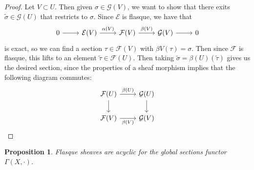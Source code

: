\documentclass[psamsfonts, 12pt]{amsart}
\newtheorem{prop}[thm]{Proposition}
\theoremstyle{definition}
\theoremstyle{remark}
\begin{document}
\begin{proof}
Let $V \subset U$. Then given $\sigma \in \mathcal{G}(V)$, we want to show that
there exits $\widetilde{\sigma} \in \mathcal{G}(U)$ that restricts to $\sigma$. Since
$\mathcal{E}$ is flasque, we have that
\[\begin{tikzcd}
0 \ar[r] & \mathcal{E}(V) \ar[r, "\alpha(V)"] & \mathcal{F}(V) \ar[r,"\beta(V)"]
& \mathcal{G}(V) \ar[r] & 0
\end{tikzcd}\]
is exact, so we can find a section $\tau \in \mathcal{F}(V)$ with
$\beta{V}(\tau) = \sigma$. Then since $\mathcal{F}$ is flasque, this lifts to
an element $\widetilde{\tau} \in \mathcal{F}(U)$. Then taking
$\widetilde{\sigma} = \beta(U)(\widetilde{\tau})$ gives us the desired section, since
the properties of a sheaf morphism implies that the following diagram commutes:
\[\begin{tikzcd}
\mathcal{F}(U) \ar[r, "\beta(U)"] \ar[d] & \mathcal{G}(U) \ar[d] \\
\mathcal{F}(V) \ar[r, "\beta(V)"'] & \mathcal{G}(V)
\end{tikzcd}\]
\end{proof}
%
\begin{prop}
Flasque sheaves are acyclic for the global sections functor $\Gamma(X, \cdot)$.
\end{prop}
%
\end{document}
